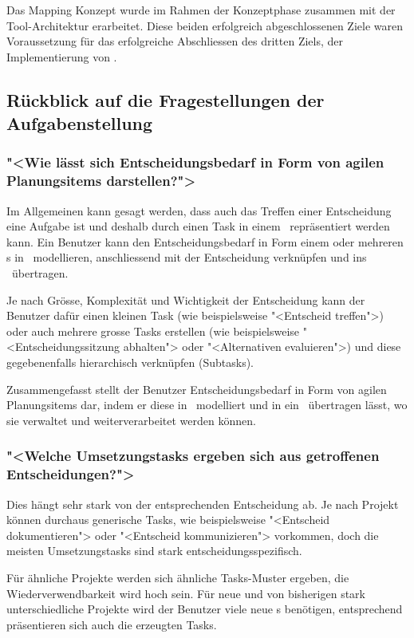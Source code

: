 		Das Mapping Konzept wurde im Rahmen der Konzeptphase zusammen mit der Tool-Architektur erarbeitet. 
		Diese beiden erfolgreich abgeschlossenen Ziele waren Voraussetzung für das erfolgreiche Abschliessen des dritten Ziels, 
		der Implementierung von \eeppi.
				
		
	
	\subsection{Rückblick auf die Fragestellungen der Aufgabenstellung}
		\subsubsection{"<Wie lässt sich Entscheidungsbedarf in Form von agilen Planungsitems darstellen?">}
			Im Allgemeinen kann gesagt werden,
			dass auch das Treffen einer Entscheidung eine Aufgabe ist
			und deshalb durch einen Task in einem \ppt\ repräsentiert werden kann.
			Ein Benutzer kann den Entscheidungsbedarf in Form einem oder mehreren \ttpl s in \eeppi\ modellieren,  
			anschliessend mit der Entscheidung verknüpfen und ins \ppt\ übertragen.
			
			Je nach Grösse, Komplexität und Wichtigkeit der Entscheidung kann der Benutzer dafür einen kleinen Task (wie beispielsweise "<Entscheid treffen">) oder auch mehrere grosse Tasks erstellen (wie beispielsweise "<Entscheidungssitzung abhalten"> oder "<Alternativen evaluieren">) und diese gegebenenfalls hierarchisch verknüpfen (Subtasks).			
			
			Zusammengefasst stellt der Benutzer Entscheidungsbedarf in Form von agilen Planungsitems dar, indem er diese in \eeppi\ modelliert und in ein \ppt\ übertragen lässt, wo sie verwaltet und weiterverarbeitet werden können.


		\subsubsection{"<Welche Umsetzungstasks ergeben sich aus getroffenen Entscheidungen?">}
			Dies hängt sehr stark von der entsprechenden Entscheidung ab.
			Je nach Projekt können durchaus generische Tasks, wie beispielsweise "<Entscheid dokumentieren"> oder "<Entscheid kommunizieren"> vorkommen,
			doch die meisten Umsetzungstasks sind stark ent\-schei\-dungs\-spezifisch.
			
			Für ähnliche Projekte werden sich ähnliche Tasks-Muster ergeben, die Wiederverwendbarkeit wird hoch sein.
			Für neue und von bisherigen stark unterschiedliche Projekte wird der Benutzer viele neue \ttpl s benötigen, 
			entsprechend präsentieren sich auch die erzeugten Tasks.
			
